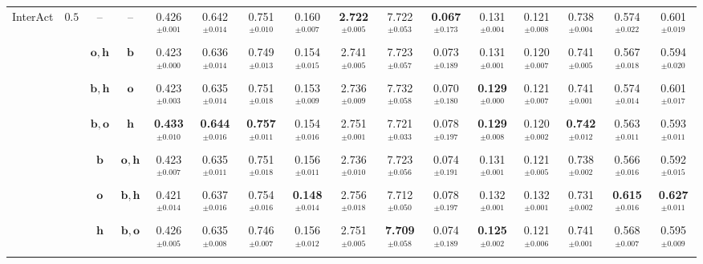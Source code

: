 \begin{table}
{\begin{tabular}{@{}cccccccccccccccc@{}}
        \multirow{7}{*}{InterAct} & \multirow{7}{*}{$0.5$} & -- & --
        & {0.426$^{\pm0.001}$} & {0.642$^{\pm0.014}$} & 0.751$^{\pm0.010}$ & 0.160$^{\pm0.007}$ & \textbf{2.722$^{\pm0.005}$} & 7.722$^{\pm0.053}$ & \textbf{0.067$^{\pm0.173}$} & 0.131$^{\pm0.004}$ & 0.121$^{\pm0.008}$ & 0.738$^{\pm0.004}$ & 0.574$^{\pm0.022}$ & 0.601$^{\pm0.019}$ \\
        & & $\boldsymbol{o}, \boldsymbol{h}$ & $\boldsymbol{b}$
        & 0.423$^{\pm0.000}$ & 0.636$^{\pm0.014}$ & 0.749$^{\pm0.013}$ & 0.154$^{\pm0.015}$ & 2.741$^{\pm0.005}$ & 7.723$^{\pm0.057}$ & 0.073$^{\pm0.189}$ & 0.131$^{\pm0.001}$ & 0.120$^{\pm0.007}$ & 0.741$^{\pm0.005}$ & 0.567$^{\pm0.018}$ & 0.594$^{\pm0.020}$ \\
        & & $\boldsymbol{b}, \boldsymbol{h}$ & $\boldsymbol{o}$
        & 0.423$^{\pm0.003}$ & 0.635$^{\pm0.014}$ & 0.751$^{\pm0.018}$ & 0.153$^{\pm0.009}$ & 2.736$^{\pm0.009}$ & 7.732$^{\pm0.058}$ & 0.070$^{\pm0.180}$ & \textbf{0.129$^{\pm0.000}$} & 0.121$^{\pm0.007}$ & 0.741$^{\pm0.001}$ & 0.574$^{\pm0.014}$ & 0.601$^{\pm0.017}$ \\
        & & $\boldsymbol{b}, \boldsymbol{o}$ & $\boldsymbol{h}$
        & \textbf{0.433$^{\pm0.010}$} & \textbf{0.644$^{\pm0.016}$} & \textbf{0.757$^{\pm0.011}$} & 0.154$^{\pm0.016}$ & 2.751$^{\pm0.001}$ & 7.721$^{\pm0.033}$ & 0.078$^{\pm0.197}$ & \textbf{0.129$^{\pm0.008}$} & 0.120$^{\pm0.002}$ & \textbf{0.742$^{\pm0.012}$} & 0.563$^{\pm0.011}$ & 0.593$^{\pm0.011}$ \\
        & & $\boldsymbol{b}$ & $\boldsymbol{o}, \boldsymbol{h}$
        & 0.423$^{\pm0.007}$ & 0.635$^{\pm0.011}$ & 0.751$^{\pm0.018}$ & 0.156$^{\pm0.011}$ & 2.736$^{\pm0.010}$ & 7.723$^{\pm0.056}$ & 0.074$^{\pm0.191}$ & 0.131$^{\pm0.001}$ & 0.121$^{\pm0.005}$ & 0.738$^{\pm0.002}$ & 0.566$^{\pm0.016}$ & 0.592$^{\pm0.015}$ \\
        & & $\boldsymbol{o}$ & $\boldsymbol{b}, \boldsymbol{h}$
        & 0.421$^{\pm0.014}$ & 0.637$^{\pm0.016}$ & 0.754$^{\pm0.016}$ & \textbf{0.148$^{\pm0.014}$} & 2.756$^{\pm0.018}$ & 7.712$^{\pm0.050}$ & 0.078$^{\pm0.197}$ & 0.132$^{\pm0.001}$ & 0.132$^{\pm0.001}$ & 0.731$^{\pm0.002}$ & \textbf{0.615$^{\pm0.016}$} & \textbf{0.627$^{\pm0.011}$} \\
        & & $\boldsymbol{h}$ & $\boldsymbol{b}, \boldsymbol{o}$
        & {0.426$^{\pm0.005}$} & 0.635$^{\pm0.008}$ & 0.746$^{\pm0.007}$ & 0.156$^{\pm0.012}$ & 2.751$^{\pm0.005}$ & \textbf{7.709$^{\pm0.058}$} & 0.074$^{\pm0.189}$ & \textbf{0.125$^{\pm0.002}$} & 0.121$^{\pm0.006}$ & 0.741$^{\pm0.001}$ & 0.568$^{\pm0.007}$ & 0.595$^{\pm0.009}$ \\
        \cmidrule(lr){2-16}


\end{tabular}}
\end{table}
